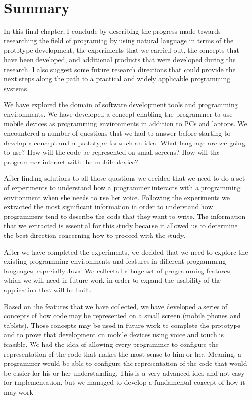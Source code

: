 \chapter{Summary}
In this final chapter, I conclude by describing the progress made towards researching the field of programing by using natural language in terms of the prototype development, the experiments that we carried out, the concepts that have been developed, and additional products that were developed during the research. I also suggest some future research directions that could provide the next steps along the path to a practical and widely applicable programming systems.

We have explored the domain of software development tools and programming environments. We have developed a concept enabling the programmer to use mobile devices as programming environments in addition to PCs and laptops. We encountered a number of questions that we had to answer before starting to develop a concept and a prototype for such an idea. What language are we going to use? How will the code be represented on small screens?  How will the programmer interact with the mobile device?

After finding solutions to all those questions we decided that we need to do a set of experiments to understand how a programmer interacts with a programming environment when she needs to use her voice. Following the experiments we extracted the most significant information in order to understand how programmers tend to describe the code that they want to write. The information that we extracted is essential for this study because it allowed us to determine the best direction concerning how to proceed with the study.

After we have completed the experiments, we decided that we need to explore the existing programming environments and features in different programming languages, especially Java. We collected a huge set of programming features, which we will need in future work in order to expand the usability of the application that will be built.

Based on the features that we have collected, we have developed a series of concepts of how code may be represented on a small screen (mobile phones and tablets). Those concepts may be used in future work to complete the prototype and to prove that development on mobile devices using voice and touch is feasible.
We had the idea of allowing every programmer to configure the representation of the code that makes the most sense to him or her. Meaning, a programmer would be able to configure the representation of the code that would be easier for his or her understanding. This is a very advanced idea and not easy for implementation, but we managed to develop a fundamental concept of how it may work.

